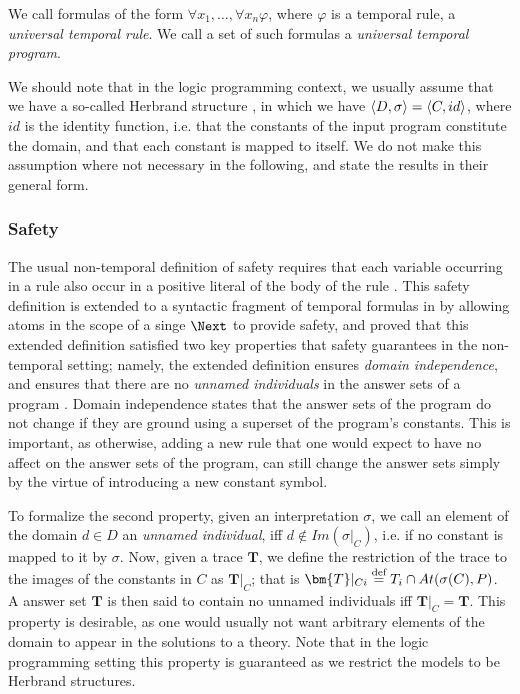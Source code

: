 \begin{definition} We call
  formulas of the form $\forall x_1, \dots, \forall x_n \varphi$,
  where $\varphi$ is a temporal rule, a \emph{universal temporal rule}. We
  call a set of such formulas a \emph{universal temporal program}.
\end{definition}

We should note that in the logic programming context, we usually
assume that we have a so-called Herbrand structure \cite{peaval06a},
in which we have $\langle D, \sigma \rangle = \langle C, id \rangle$, where $id$ is the
identity function, i.e. that the constants of the input program
constitute the domain, and that each constant is mapped to itself. We
do not make this assumption where not necessary in the following, and
state the results in their general form.

\subsubsection{Safety}

The usual non-temporal definition of safety requires that each
variable occurring in a rule also occur in a positive literal of the
body of the rule \cite{gekakasc12a}. This safety definition is
extended to a syntactic fragment of temporal formulas in
\cite{agcapevidi17a} by allowing atoms in the scope of a singe $\Next$
to provide safety, and proved that this extended definition satisfied
two key properties that safety guarantees in the non-temporal setting;
namely, the extended definition ensures \emph{domain independence},
and ensures that there are no \emph{unnamed individuals} in the answer
sets of a program \cite{capeva09a} \cite{capeva09b}. Domain
independence states that the answer sets of the program do not change
if they are ground using a superset of the program's constants. This
is important, as otherwise, adding a new rule that one would expect to
have no affect on the answer sets of the program, can still change the
answer sets simply by the virtue of introducing a new constant symbol.

To formalize the second property, given an interpretation $\sigma$, we
call an element of the domain $d \in D$ an \emph{unnamed individual},
iff $d \not\in Im(\sigma\vert_{C})$, i.e. if no constant is mapped to
it by $\sigma$. Now, given a trace $\bm{T}$, we define the restriction
of the trace to the images of the constants in $C$ as
$\bm{T}\vert _C$; that is
$\bm{T}\vert_{Ci} \defeq T_i \cap At(\sigma(C),P)$. A answer set
$\bm{T}$ is then said to contain no unnamed individuals iff
$\bm{T} \vert_{C} = \bm{T}$. This property is desirable, as one would
usually not want arbitrary elements of the domain to appear in the
solutions to a theory. Note that in the logic programming setting this
property is guaranteed as we restrict the models to be Herbrand
structures.

